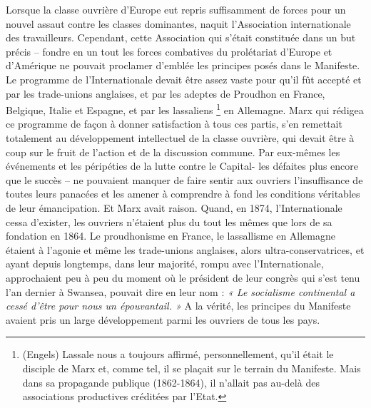 \documentclass[french,twoside]{book} %
\begin{document}
Lorsque la classe ouvrière d’Europe eut repris suffisamment de forces pour un nouvel assaut contre les classes dominantes, naquit l’Association internationale des travailleurs. Cependant, cette Association qui s’était constituée dans un but précis – fondre en un tout les forces combatives du prolétariat d’Europe et d’Amérique ne pouvait proclamer d’emblée les principes posés dans le Manifeste. Le programme de l’Internationale devait être assez vaste pour qu’il fût accepté et par les trade-unions anglaises, et par les adeptes de Proudhon en France, Belgique, Italie et Espagne, et par les lassaliens \footnote{(Engels) Lassale nous a toujours affirmé, personnellement, qu’il était le disciple de Marx et, comme tel, il se plaçait sur le terrain du Manifeste. Mais dans sa propagande publique (1862-1864), il n’allait pas au-delà des associations productives créditées par l’Etat.} en Allemagne. Marx qui rédigea ce programme de façon à donner satisfaction à tous ces partis, s’en remettait totalement au développement intellectuel de la classe ouvrière, qui devait être à coup sur le fruit de l’action et de la discussion commune. Par eux-mêmes les événements et les péripéties de la lutte contre le Capital- les défaites plus encore que le succès – ne pouvaient manquer de faire sentir aux ouvriers l’insuffisance de toutes leurs panacées et les amener à comprendre à fond les conditions véritables de leur émancipation. Et Marx avait raison. Quand, en 1874, l’Internationale cessa d’exister, les ouvriers n’étaient plus du tout les mêmes que lors de sa fondation en 1864. Le proudhonisme en France, le lassallisme en Allemagne étaient à l’agonie et même les trade-unions anglaises, alors ultra-conservatrices, et ayant depuis longtemps, dans leur majorité, rompu avec l’Internationale, approchaient peu à peu du moment où le président de leur congrès qui s’est tenu l’an dernier à Swansea, pouvait dire en leur nom : \emph{« Le socialisme continental a cessé d’être pour nous un épouvantail. »} A la vérité, les principes du Manifeste avaient pris un large développement parmi les ouvriers de tous les pays.\par
\end{document}
